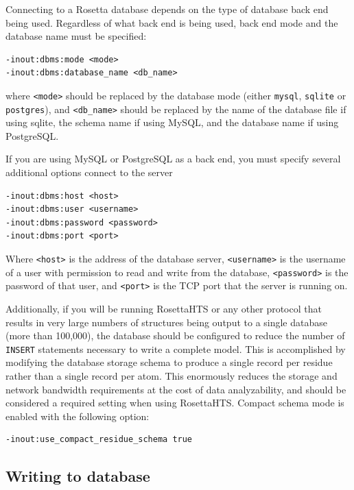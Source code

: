 Connecting to a Rosetta database depends on the type of database back end being used.  Regardless of what back end is being used, back end mode and the database name must be specified:

\singlespace
\begin{Verbatim}
-inout:dbms:mode <mode>
-inout:dbms:database_name <db_name>
\end{Verbatim}
\doublespace

where \texttt{<mode>} should be replaced by the database mode (either \texttt{mysql}, \texttt{sqlite} or \texttt{postgres}), and \texttt{<db\_name>} should be replaced by the name of the database file if using sqlite, the schema name if using MySQL, and the database name if using PostgreSQL.

If you are using MySQL or PostgreSQL as a back end, you must specify several additional options connect to the server

\singlespace
\begin{Verbatim}
-inout:dbms:host <host>
-inout:dbms:user <username>
-inout:dbms:password <password>
-inout:dbms:port <port>
\end{Verbatim}
\doublespace

Where \texttt{<host>} is the address of the database server, \texttt{<username>} is the username of a user with permission to read and write from the database, \texttt{<password>} is the password of that user, and \texttt{<port>} is the TCP port that the server is running on. 

Additionally, if you will be running RosettaHTS or any other protocol that results in very large numbers of structures being output to a single database (more than 100,000), the database should be configured to reduce the number of \texttt{INSERT} statements necessary to write a complete model.
This is accomplished by modifying the database storage schema to produce a single record per residue rather than a single record per atom.  This enormously reduces the storage and network bandwidth requirements at the cost of data analyzability, and should be considered a required setting when using RosettaHTS.
Compact schema mode is enabled with the following option:

\singlespace
\begin{Verbatim}
-inout:use_compact_residue_schema true
\end{Verbatim}
\doublespace

\subsection{Writing to database}


